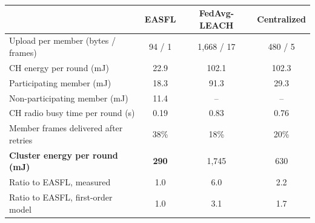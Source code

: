 \documentclass[journal]{IEEEtran}
\newcommand{\revtab}{\ifdefined\cleanversion\else\color{blue}\fi}
\begin{document}
\begin{table}[t]
\caption{}\label{tab:testbed}
\centering\scriptsize\setlength{\tabcolsep}{2.2pt}\revtab
\begin{tabular}{@{}lccc@{}}
\toprule
 & EASFL & FedAvg-LEACH & Centralized\\
\midrule
Upload per member (bytes / frames) & 94 / 1 & 1{,}668 / 17 & 480 / 5\\
CH energy per round (mJ) & 22.9 & 102.1 & 102.3\\
Participating member (mJ) & 18.3 & 91.3 & 29.3\\
Non-participating member (mJ) & 11.4 & -- & --\\
CH radio busy time per round (s) & 0.19 & 0.83 & 0.76\\
Member frames delivered after retries & 38\% & 18\% & 20\%\\
\textbf{Cluster energy per round (mJ)} & \textbf{290} & 1{,}745 & 630\\
Ratio to EASFL, measured & 1.0 & 6.0 & 2.2\\
Ratio to EASFL, first-order model & 1.0 & 3.1 & 1.7\\
\bottomrule
\end{tabular}
\end{table}
\end{document}
